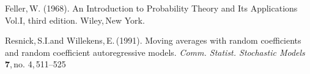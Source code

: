 {\sc Feller,\,W.} (1968).
An Introduction to Probability Theory and Its Applications Vol.I, third edition.
{\em}Wiley,\,New York.

{\sc Resnick,\,S.I.and Willekens,\,E.}\,(1991).
Moving averages with random coefficients and random coefficient autoregressive models.
{\em Comm. Statist. Stochastic Models} \,{\bf 7},\,no. 4,\,511--525
